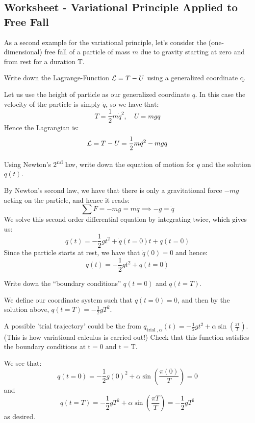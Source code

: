 \documentclass[../PHYS306Notes.tex]{subfiles}
\begin{document}
\subsection{Worksheet - Variational Principle Applied to Free Fall}
As a second example for the variational principle, let’s consider the (one-dimensional) free fall of a particle of mass $m$ due to gravity starting at zero and from rest for a duration T.

\begin{p}
Write down the Lagrange-Function $\mathcal{L} = T - U$ using a generalized coordinate q.
\end{p}
\begin{s}
Let us use the height of particle as our generalized coordinate $q$. In this case the velocity of the particle is simply $\dot{q}$, so we have that:
\[T = \frac{1}{2}m\dot{q}^2, \quad U = mgq\]
Hence the Lagrangian is:
\[\mathcal{L} = T - U = \frac{1}{2}m\dot{q}^2 - mgq\]
\end{s}

\begin{p}
Using Newton’s 2\textsuperscript{nd} law, write down the equation of motion for $q$ and the solution $q(t)$.
\end{p}
\begin{s}
By Newton's second law, we have that there is only a gravitational force $-mg$ acting on the particle, and hence it reads:
\[\sum F = -mg = m\ddot{q} \implies -g = \ddot{q}\]
We solve this second order differential equation by integrating twice, which gives us:
\[q(t) = -\frac{1}{2}gt^2 + \dot{q}(t=0)t + q(t=0)\]
Since the particle starts at rest, we have that $\dot{q}(0) = 0$ and hence:
\[q(t) = -\frac{1}{2}gt^2 + q(t=0)\]
\end{s}

\begin{p}
Write down the “boundary conditions” $q(t=0)$ and $q(t=T)$.
\end{p}
\begin{s}
We define our coordinate system such that $q(t=0) = 0$, and then by the solution above, $q(t=T) = -\frac{1}{2}gT^2$.
\end{s}

\begin{p}
A possible 'trial trajectory' could be the from $q_{\text {trial }, \alpha}(t)=-\frac{1}{2} g t^{2}+\alpha \sin \left(\frac{\pi t}{T}\right)$. (This is how variational calculus is carried out!) Check that this function satisfies the boundary conditions at $\mathrm{t}=0$ and $\mathrm{t}=\mathrm{T}$.
\end{p}
\begin{s}
We see that:
\[q(t=0) = -\frac{1}{2}g(0)^2 + \alpha \sin \left(\frac{\pi (0)}{T}\right) = 0\]
and
\[q(t=T) = -\frac{1}{2}gT^2 + \alpha \sin \left(\frac{\pi T}{T}\right) = -\frac{1}{2}gT^2 \]
as desired.
\end{s}
\end{document}

